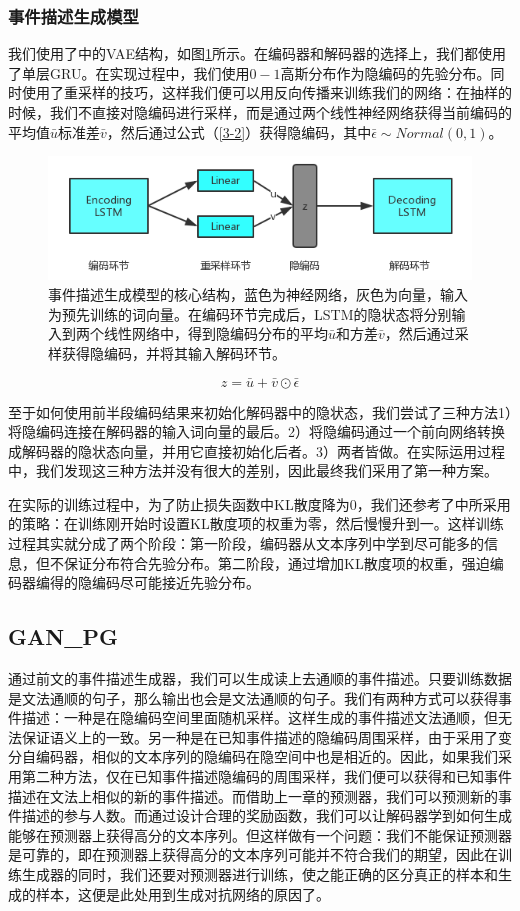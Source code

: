\subsubsection{事件描述生成模型}
我们使用了\cite{bowman_generating_2015}中的VAE结构，如图\ref{f3-2}所示。在编码器和解码器的选择上，我们都使用了单层GRU。在实现过程中，我们使用$0-1$高斯分布作为隐编码的先验分布。同时使用了重采样\cite{kingma_auto-encoding_2013}的技巧，这样我们便可以用反向传播来训练我们的网络：在抽样的时候，我们不直接对隐编码进行采样，而是通过两个线性神经网络获得当前编码的平均值$\bar{u}$标准差$\bar{v}$，然后通过公式（\ref{3-2}）获得隐编码，其中$\bar\epsilon \sim Normal(0,1)$。
\begin{figure}[htb]\label{f3-2}
    \centering
    \includegraphics[width=11.3cm]{vae.png}
    \caption{事件描述生成模型的核心结构，蓝色为神经网络，灰色为向量，输入为预先训练的词向量。在编码环节完成后，LSTM的隐状态将分别输入到两个线性网络中，得到隐编码分布的平均$\bar{u}$和方差$\bar{v}$，然后通过采样获得隐编码，并将其输入解码环节。}
\end{figure}
\begin{equation}\label{3-2}
    z=\bar{u}+\bar{v}\odot \bar\epsilon
\end{equation}

至于如何使用前半段编码结果来初始化解码器中的隐状态，我们尝试了三种方法1）将隐编码连接在解码器的输入词向量的最后。2）将隐编码通过一个前向网络转换成解码器的隐状态向量，并用它直接初始化后者。3）两者皆做。在实际运用过程中，我们发现这三种方法并没有很大的差别，因此最终我们采用了第一种方案。

在实际的训练过程中，为了防止损失函数中KL散度降为0，我们还参考了\cite{bowman_generating_2015}中所采用的策略：在训练刚开始时设置KL散度项的权重为零，然后慢慢升到一。这样训练过程其实就分成了两个阶段：第一阶段，编码器从文本序列中学到尽可能多的信息，但不保证分布符合先验分布。第二阶段，通过增加KL散度项的权重，强迫编码器编得的隐编码尽可能接近先验分布。

\subsection{GAN\_PG}
通过前文的事件描述生成器，我们可以生成读上去通顺的事件描述。只要训练数据是文法通顺的句子，那么输出也会是文法通顺的句子。我们有两种方式可以获得事件描述：一种是在隐编码空间里面随机采样。这样生成的事件描述文法通顺，但无法保证语义上的一致。另一种是在已知事件描述的隐编码周围采样，由于采用了变分自编码器，相似的文本序列的隐编码在隐空间中也是相近的。因此，如果我们采用第二种方法，仅在已知事件描述隐编码的周围采样，我们便可以获得和已知事件描述在文法上相似的新的事件描述。而借助上一章的预测器，我们可以预测新的事件描述的参与人数。而通过设计合理的奖励函数，我们可以让解码器学到如何生成能够在预测器上获得高分的文本序列。但这样做有一个问题：我们不能保证预测器是可靠的，即在预测器上获得高分的文本序列可能并不符合我们的期望，因此在训练生成器的同时，我们还要对预测器进行训练，使之能正确的区分真正的样本和生成的样本，这便是此处用到生成对抗网络的原因了。
